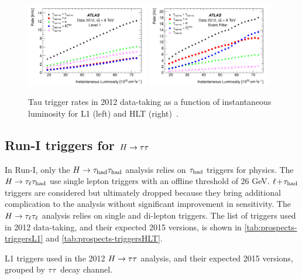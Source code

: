 \begin{figure}[tp]
  \centering
  \includegraphics[width=0.48\textwidth]{figures/PERF-2013-06/fig_01a}
  \includegraphics[width=0.48\textwidth]{figures/PERF-2013-06/fig_01b}
  \caption{Tau trigger rates in 2012 data-taking as a function of instantaneous luminosity for L1 (left) and HLT (right)~\cite{PERF-2013-06}.}
  \label{fig:prospects-tautriggerrates}
\end{figure}

\subsection{Run-I triggers for $H\rightarrow\tau\tau$}

In Run-I, only the $H\rightarrow\tau_\text{had}\tau_\text{had}$ analysis relies on $\tau_\text{had}$ triggers for physics. The $H\rightarrow\tau_\ell\tau_\text{had}$ use single lepton triggers with an offline threshold of 26 GeV. $\ell\!+\!\tau_\text{had}$ triggers are considered but ultimately dropped because they bring additional complication to the analysis without significant improvement in sensitivity. The $H\rightarrow\tau_\ell\tau_\ell$ analysis relies on single and di-lepton triggers. The list of triggers used in 2012 data-taking, and their expected 2015 versions, is shown in \cref{tab:prospects-triggersL1} and \cref{tab:prospects-triggersHLT}.

\begin{table}[bp] 
  \centering
  \renewcommand{\arraystretch}{1.4}
  \caption{L1 triggers used in the 2012 $H\rightarrow\tau\tau$ analysis, and their expected 2015 versions, grouped by $\tau\tau$ decay channel.}
  
  \label{tab:prospects-triggersL1}
\end{table}

